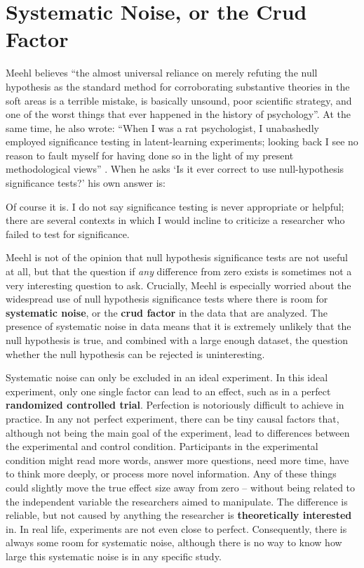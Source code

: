 \documentclass[
  oneside]{krantz}
\renewenvironment{quote}{\begin{VF}}{\end{VF}}
\begin{document}
\hypertarget{crud}{%
\section{Systematic Noise, or the Crud Factor}\label{crud}}

Meehl \citeyearpar{meehl_theoretical_1978} believes ``the almost universal reliance on merely refuting the null hypothesis as the standard method for corroborating substantive theories in the soft areas is a terrible mistake, is basically unsound, poor scientific strategy, and one of the worst things that ever happened in the history of psychology''. At the same time, he also wrote: ``When I was a rat psychologist, I unabashedly employed significance testing in latent-learning experiments; looking back I see no reason to fault myself for having done so in the light of my present methodological views'' \citep{meehl_appraising_1990}. When he asks `Is it ever correct to use null-hypothesis significance tests?' his own answer is:

\begin{quote}
Of course it is. I do not say significance testing is never appropriate or helpful; there are several contexts in which I would incline to criticize a researcher who failed to test for significance.
\end{quote}

Meehl is not of the opinion that null hypothesis significance tests are not useful at all, but that the question if \emph{any} difference from zero exists is sometimes not a very interesting question to ask. Crucially, Meehl is especially worried about the widespread use of null hypothesis significance tests where there is room for \textbf{systematic noise}, or the \textbf{crud factor} in the data that are analyzed. The presence of systematic noise in data means that it is extremely unlikely that the null hypothesis is true, and combined with a large enough dataset, the question whether the null hypothesis can be rejected is uninteresting.

Systematic noise can only be excluded in an ideal experiment. In this ideal experiment, only one single factor can lead to an effect, such as in a perfect \textbf{randomized controlled trial}. Perfection is notoriously difficult to achieve in practice. In any not perfect experiment, there can be tiny causal factors that, although not being the main goal of the experiment, lead to differences between the experimental and control condition. Participants in the experimental condition might read more words, answer more questions, need more time, have to think more deeply, or process more novel information. Any of these things could slightly move the true effect size away from zero -- without being related to the independent variable the researchers aimed to manipulate. The difference is reliable, but not caused by anything the researcher is \textbf{theoretically interested} in. In real life, experiments are not even close to perfect. Consequently, there is always some room for systematic noise, although there is no way to know how large this systematic noise is in any specific study.
\end{document}
